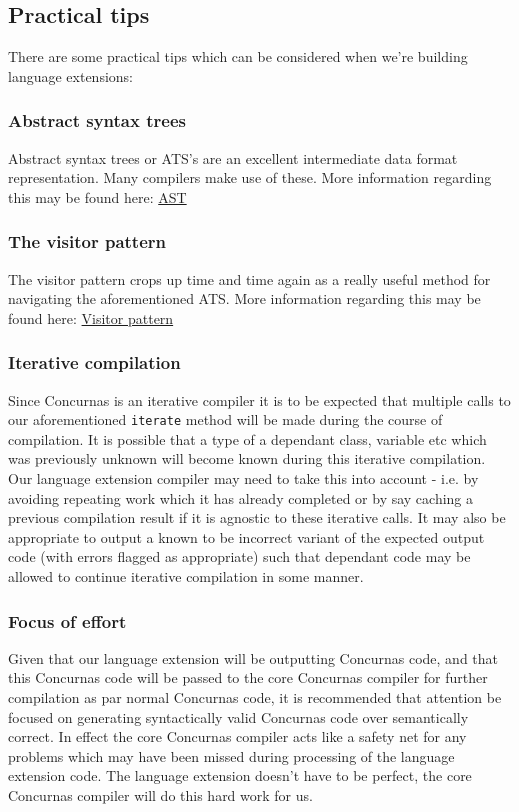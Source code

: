 \documentclass[conc-doc]{subfiles}
\begin{document}
\subsection{Practical tips}
There are some practical tips which can be considered when we're building language extensions:

\subsubsection{Abstract syntax trees}
Abstract syntax trees or ATS's are an excellent intermediate data format representation. Many compilers make use of these. More information regarding this may be found here: \href{https://en.wikipedia.org/wiki/Abstract_syntax_tree}{AST}

\subsubsection{The visitor pattern}
The visitor pattern crops up time and time again as a really useful method for navigating the aforementioned ATS. More information regarding this may be found here: \href{https://en.wikipedia.org/wiki/Visitor_pattern}{Visitor pattern}

\subsubsection{Iterative compilation}
Since Concurnas is an iterative compiler it is to be expected that multiple calls to our aforementioned \lstinline{iterate} method will be made during the course of compilation. It is possible that a type of a dependant class, variable etc which was previously unknown will become known during this iterative compilation. Our language extension compiler may need to take this into account - i.e. by avoiding repeating work which it has already completed or by say caching a previous compilation result if it is agnostic to these iterative calls. It may also be appropriate to output a known to be incorrect variant of the expected output code (with errors flagged as appropriate) such that dependant code may be allowed to continue iterative compilation in some manner.

\subsubsection{Focus of effort}
Given that our language extension will be outputting Concurnas code, and that this Concurnas code will be passed to the core Concurnas compiler for further compilation as par normal Concurnas code, it is recommended that attention be focused on generating syntactically valid Concurnas code over semantically correct. In effect the core Concurnas compiler acts like a safety net for any problems which may have been missed during processing of the language extension code. The language extension doesn't have to be perfect, the core Concurnas compiler will do this hard work for us.
\end{document}
